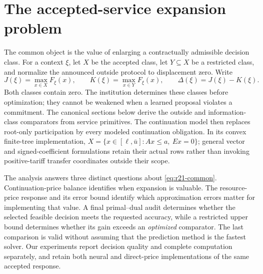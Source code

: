 \section{The accepted-service expansion problem}\label{sec:r21-early}
The common object is the value of enlarging a contractually admissible decision class. For a context $\xi$, let $X$ be the accepted class, let $Y\subseteq X$ be a restricted class, and normalize the announced outside protocol to displacement zero. Write
\begin{equation}\label{eq:r21-common}
 J(\xi)=\max_{x\in X}F_\xi(x),\qquad
 K(\xi)=\max_{x\in Y}F_\xi(x),\qquad
 \Delta(\xi)=J(\xi)-K(\xi).
\end{equation}
Both classes contain zero. The institution determines these classes before optimization; they cannot be weakened when a learned proposal violates a commitment. The canonical sections below derive the outside and information-class comparators from service primitives. The continuation model then replaces root-only participation by every modeled continuation obligation. In its convex finite-tree implementation,
$X=\{x\in[\ell,\bar u]:Ax\leq a,\ Ex=0\}$; general vector and signed-coefficient formulations retain their actual rows rather than invoking positive-tariff transfer coordinates outside their scope.

The analysis answers three distinct questions about \eqref{eq:r21-common}. Continuation-price balance identifies when expansion is valuable. The resource-price response and its error bound identify which approximation errors matter for implementing that value. A final primal--dual audit determines whether the selected feasible decision meets the requested accuracy, while a restricted upper bound determines whether its gain exceeds an \emph{optimized} comparator. The last comparison is valid without assuming that the prediction method is the fastest solver. Our experiments report decision quality and complete computation separately, and retain both neural and direct-price implementations of the same accepted response.
